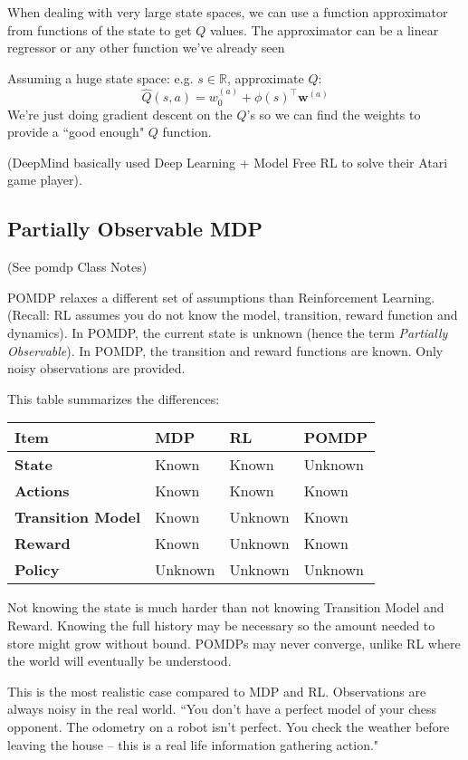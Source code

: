 \documentclass[11pt, oneside]{article}   	%
\begin{document}
When dealing with very large state spaces, we can use a function approximator from functions of the state to get $Q$ values.  The approximator can be a linear regressor or any other function we've already seen

Assuming a huge state space: e.g. $s \in \mathbb{R}$, approximate $Q$:
\[
\hat{Q}(s,a) = w_0^{(a)} + \phi(s)^\intercal \mathbf{w}^{(a)}
\]
We're just doing gradient descent on the $Q$'s so we can find the weights to provide a ``good enough" $Q$ function.

(DeepMind basically used Deep Learning + Model Free RL to solve their Atari game player).

\subsection{Partially Observable MDP}

(See pomdp Class Notes)

POMDP relaxes a different set of assumptions than Reinforcement Learning. (Recall: RL assumes you do not know the model, transition, reward function and dynamics). In POMDP, the current state is unknown (hence the term \emph{Partially Observable}). In POMDP, the transition and reward functions are known. Only noisy observations are provided.

This table summarizes the differences:
\begin{center}
	\begin{tabular}{| l | l | l | l |}
	\hline
	\bf{Item}  			& \bf{MDP} & \bf{RL} & \bf{POMDP} \\ \hline
	\bf{State}	  		& Known & Known & Unknown \\ \hline
	\bf{Actions} 			& Known & Known   & Known     \\ \hline
	\bf{Transition Model} 	& Known & Unknown & Known   \\ \hline
	\bf{Reward}			& Known & Unknown & Known 	 \\ \hline
	\bf{Policy}			& Unknown & Unknown & Unknown \\ 
	\hline
	\end{tabular}
\end{center}

Not knowing the state is much harder than not knowing Transition Model and Reward. Knowing the full history may be 
necessary so the amount needed to store might grow without bound. POMDPs may never converge, unlike RL where the world will eventually be understood.

This is the most realistic case compared to MDP and RL. Observations are always noisy in the real world. ``You don't have a perfect model of your chess opponent. The odometry on a robot isn't perfect. You check the weather before leaving the house -- this is a real life information gathering action."
\end{document}
